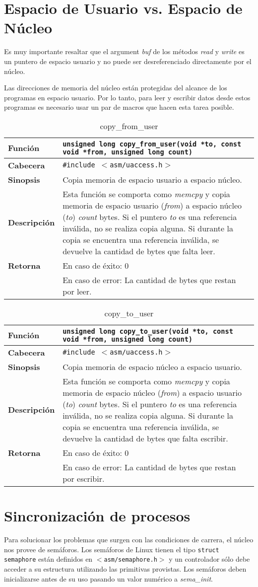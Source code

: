 \documentclass[12pt,a4paper,spanish]{article}
\newenvironment{funcdesc}[1]
	{	
		\begin{table}[!htp]
		\caption{ {#1} }
		\begin{small}
		\begin{tabular}{ | l | p{10cm} | } \hline
	}
	{
		\end{tabular}
		\end{small}
		\end{table}
	}
\newcommand{\funcion}[1] {\textbf {Función} &  \texttt{{#1}} \\ \hline}
\newcommand{\cabecera}[1] {\textbf {Cabecera} &  \texttt{\#include $<${#1}$>$} \\ \hline}
\newcommand{\sinopsis}[1] {\textbf {Sinopsis} &  {#1} \\ \hline}
\newcommand{\descrip}[1] {\textbf {Descripción} &  {#1} \\ \hline}
\newcommand{\return}[2]{ \textbf{Retorna} & En caso de éxito: {#1} \\ & En caso de error: {#2} \\ \hline }
\begin{document}
\section{Espacio de Usuario vs. Espacio de Núcleo} 

Es muy importante resaltar que el argument \textit{buf} de los métodos \textit{read} y \textit{write} es un puntero de espacio usuario y no puede ser desreferenciado directamente por el núcleo.

Las direcciones de memoria del núcleo están protegidas del alcance de los programas en espacio usuario. Por lo tanto, para leer y escribir datos desde estos programas es necesario usar un par de macros que hacen esta tarea posible.

\begin{funcdesc}{copy\_from\_user}
\funcion{unsigned long copy\_from\_user(void *to, const void *from, unsigned long count)}
\cabecera{asm/uaccess.h}
\sinopsis{Copia memoria de espacio usuario a espacio núcleo.}
\descrip{Esta función se comporta como \textit{memcpy} y copia memoria de espacio usuario (\textit{from})  a espacio núcleo (\textit{to}) \textit{count} bytes. Si el puntero \textit{to} es una referencia inválida, no se realiza copia alguna. Si durante la copia se encuentra una referencia inválida, se devuelve la cantidad de bytes que falta leer. }
\return{0}{La cantidad de bytes que restan por leer.}
\end{funcdesc}

\begin{funcdesc}{copy\_to\_user}
\funcion{unsigned long copy\_to\_user(void *to, const void *from, unsigned long count)}
\cabecera{asm/uaccess.h}
\sinopsis{Copia memoria de espacio núcleo a espacio usuario.}
\descrip{Esta función se comporta como \textit{memcpy} y copia memoria de espacio núcleo (\textit{from})  a espacio usuario (\textit{to})  \textit{count} bytes. Si el puntero \textit{to} es una referencia inválida, no se realiza copia alguna. Si durante la copia se encuentra una referencia inválida, se devuelve la cantidad de bytes que falta escribir. }
\return{0}{La cantidad de bytes que restan por escribir.}
\end{funcdesc}

\section{Sincronización de procesos}

Para solucionar los problemas que surgen con las condiciones de carrera, el núcleo nos provee de semáforos. Los semáforos de Linux tienen el tipo \texttt{struct semaphore} están definidos en \texttt{$<$asm/semaphore.h$>$} y un controlador sólo debe acceder a su estructura utilizando las primitivas provistas. Los semáforos deben inicializarse antes de su uso pasando un valor numérico a \textit{sema\_init}.
\end{document}
